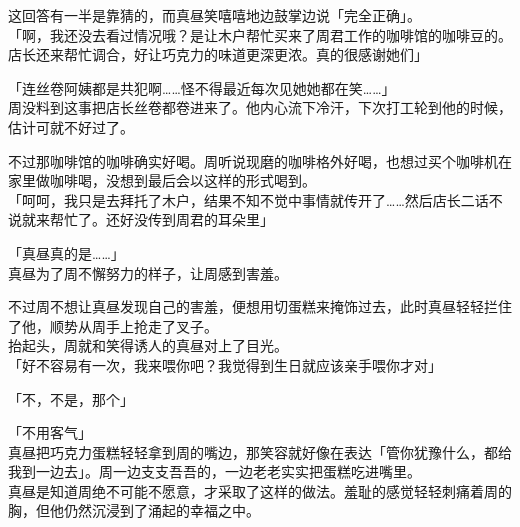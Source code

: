 这回答有一半是靠猜的，而真昼笑嘻嘻地边鼓掌边说「完全正确」。\\

「啊，我还没去看过情况哦？是让木户帮忙买来了周君工作的咖啡馆的咖啡豆的。店长还来帮忙调合，好让巧克力的味道更深更浓。真的很感谢她们」

「连丝卷阿姨都是共犯啊……怪不得最近每次见她她都在笑……」\\

周没料到这事把店长丝卷都卷进来了。他内心流下冷汗，下次打工轮到他的时候，估计可就不好过了。

不过那咖啡馆的咖啡确实好喝。周听说现磨的咖啡格外好喝，也想过买个咖啡机在家里做咖啡喝，没想到最后会以这样的形式喝到。\\

「呵呵，我只是去拜托了木户，结果不知不觉中事情就传开了……然后店长二话不说就来帮忙了。还好没传到周君的耳朵里」

「真昼真的是……」\\

真昼为了周不懈努力的样子，让周感到害羞。

不过周不想让真昼发现自己的害羞，便想用切蛋糕来掩饰过去，此时真昼轻轻拦住了他，顺势从周手上抢走了叉子。\\

抬起头，周就和笑得诱人的真昼对上了目光。\\

「好不容易有一次，我来喂你吧？我觉得到生日就应该亲手喂你才对」

「不，不是，那个」

「不用客气」\\

真昼把巧克力蛋糕轻轻拿到周的嘴边，那笑容就好像在表达「管你犹豫什么，都给我到一边去」。周一边支支吾吾的，一边老老实实把蛋糕吃进嘴里。\\

真昼是知道周绝不可能不愿意，才采取了这样的做法。羞耻的感觉轻轻刺痛着周的胸，但他仍然沉浸到了涌起的幸福之中。
